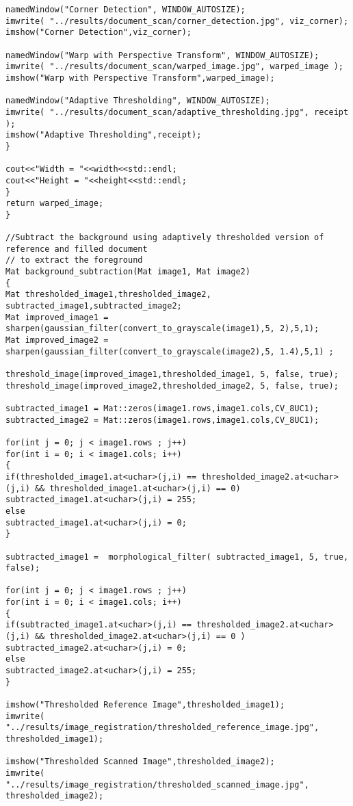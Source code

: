 \begin{lstlisting}
namedWindow("Corner Detection", WINDOW_AUTOSIZE);
imwrite( "../results/document_scan/corner_detection.jpg", viz_corner);
imshow("Corner Detection",viz_corner);

namedWindow("Warp with Perspective Transform", WINDOW_AUTOSIZE);
imwrite( "../results/document_scan/warped_image.jpg", warped_image );
imshow("Warp with Perspective Transform",warped_image);	  

namedWindow("Adaptive Thresholding", WINDOW_AUTOSIZE);
imwrite( "../results/document_scan/adaptive_thresholding.jpg", receipt );
imshow("Adaptive Thresholding",receipt);
}

cout<<"Width = "<<width<<std::endl;
cout<<"Height = "<<height<<std::endl;
}
return warped_image;
}

//Subtract the background using adaptively thresholded version of reference and filled document
// to extract the foreground
Mat background_subtraction(Mat image1, Mat image2)
{
Mat thresholded_image1,thresholded_image2, subtracted_image1,subtracted_image2;
Mat improved_image1 = sharpen(gaussian_filter(convert_to_grayscale(image1),5, 2),5,1);
Mat improved_image2 = sharpen(gaussian_filter(convert_to_grayscale(image2),5, 1.4),5,1) ;

threshold_image(improved_image1,thresholded_image1, 5, false, true);
threshold_image(improved_image2,thresholded_image2, 5, false, true);

subtracted_image1 = Mat::zeros(image1.rows,image1.cols,CV_8UC1);
subtracted_image2 = Mat::zeros(image1.rows,image1.cols,CV_8UC1);

for(int j = 0; j < image1.rows ; j++)
for(int i = 0; i < image1.cols; i++)
{
if(thresholded_image1.at<uchar>(j,i) == thresholded_image2.at<uchar>(j,i) && thresholded_image1.at<uchar>(j,i) == 0)
subtracted_image1.at<uchar>(j,i) = 255;
else
subtracted_image1.at<uchar>(j,i) = 0;
}	

subtracted_image1 =  morphological_filter( subtracted_image1, 5, true, false);

for(int j = 0; j < image1.rows ; j++)
for(int i = 0; i < image1.cols; i++)
{
if(subtracted_image1.at<uchar>(j,i) == thresholded_image2.at<uchar>(j,i) && thresholded_image2.at<uchar>(j,i) == 0 )
subtracted_image2.at<uchar>(j,i) = 0;
else
subtracted_image2.at<uchar>(j,i) = 255;			
}

imshow("Thresholded Reference Image",thresholded_image1);
imwrite( "../results/image_registration/thresholded_reference_image.jpg", thresholded_image1);

imshow("Thresholded Scanned Image",thresholded_image2);
imwrite( "../results/image_registration/thresholded_scanned_image.jpg", thresholded_image2);


\end{lstlisting}
